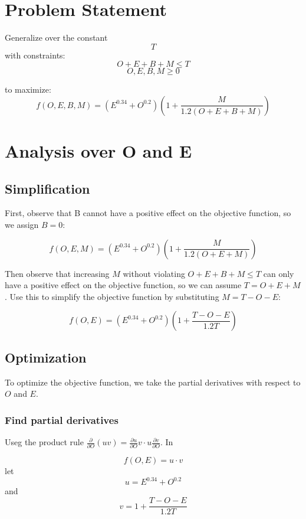 \documentclass{article}
\begin{document}
\tableofcontents

\section{Problem Statement}

Generalize over the constant $$T$$
with constraints:
\[
O + E + B + M \leq T
\]
\[
O, E, B, M \geq 0
\]

to maximize:
\[
f(O, E, B, M) = \left( E^{0.34} + O^{0.2} \right) \left( 1 + \frac{M}{1.2 \left( O + E + B + M \right)} \right)
\]

\section{Analysis over O and E}

\subsection{Simplification}

First, observe that B cannot have a positive effect on the objective function, so we assign $B = 0$:

\[
f(O, E, M) = \left( E^{0.34} + O^{0.2} \right) \left( 1 + \frac{M}{1.2 \left( O + E + M \right)} \right)
\]

Then observe that increasing $M$ without violating $O + E + B + M \leq T$ can only have a positive effect on the objective function, so we can assume $T = O + E + M$. Use this to simplify the objective function by substituting $M = T - O - E$:

\[
f(O, E) = \left( E^{0.34} + O^{0.2} \right) \left( 1 + \frac{T - O - E}{1.2 T} \right)
\]

\subsection{Optimization}

To optimize the objective function, we take the partial derivatives with respect to $O$ and $E$.

\subsubsection{Find partial derivatives}

Useg the product rule $\frac{\partial}{\partial O}(uv) = \frac{\partial u}{\partial O}v \cdot u\frac{\partial v}{\partial O}$. In

\begin{equation}\label{eq:fuv}
  f(O, E) = u \cdot v
\end{equation}
let
\begin{equation}\label{eq:u}
  u = E^{0.34} + O^{0.2}
\end{equation}
and
\begin{equation}\label{eq:v}
  v = 1 + \frac{T - O - E}{1.2 T}
\end{equation}
\end{document}
